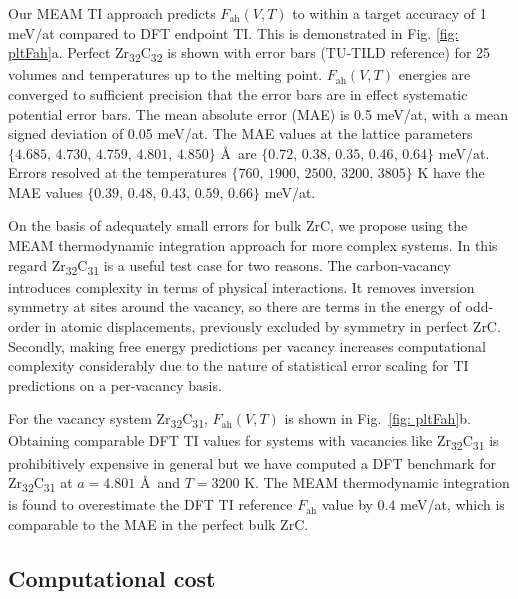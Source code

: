 \documentclass[twocolumn,american,aps,prb,showpacs,showkeys,amsmath,amssymb,superscriptaddress,a4]{revtex4-1}
\begin{document}
Our MEAM TI approach predicts $F_{\text{ah}}(V,T)$ to within
a target accuracy of 1 meV/at compared to DFT endpoint TI. This is
demonstrated in Fig. \ref{fig: pltFah}a. Perfect Zr\textsubscript{32}C\textsubscript{32}
is shown with error bars (TU-TILD reference) for 25 volumes and temperatures
up to the melting point. $F_{\text{ah}}(V,T)$ energies
are converged to sufficient precision that the error bars are in effect
systematic potential error bars. The mean absolute error (MAE) is
0.5 meV/at, with a mean signed deviation of 0.05 meV/at. The MAE values
at the lattice parameters $\{4.685,\,4.730,\,4.759,\,4.801,\,4.850\}$
\AA \ are $\{0.72,\,0.38,\,0.35,\,0.46,\,0.64\}$ meV/at. 
Errors resolved
at the temperatures $\{760,\,1900,\,2500,\,3200,\,3805\}$ K have
the MAE values $\{0.39,\,0.48,\,0.43,\,0.59,\,0.66\}$ meV/at. 

On the basis of adequately small errors for bulk ZrC, we propose using
the MEAM thermodynamic integration approach for more complex systems.
In this regard Zr\textsubscript{32}C\textsubscript{31} is a useful
test case for two reasons. The carbon-vacancy introduces complexity
in terms of physical interactions. It removes inversion symmetry at
 sites around the vacancy, so there are terms in the energy of odd-order in atomic displacements, previously
excluded by symmetry in perfect ZrC. Secondly, making free energy
predictions per vacancy increases computational complexity considerably due to the nature of statistical
error scaling for TI predictions on a per-vacancy basis. 

For the vacancy system Zr\textsubscript{32}C\textsubscript{31},
$F_{\text{ah}}(V,T)$ is shown in Fig.~\ref{fig: pltFah}b.
Obtaining comparable DFT TI values for systems with vacancies
like Zr\textsubscript{32}C\textsubscript{31} is prohibitively expensive
in general but we have computed a  DFT benchmark for Zr\textsubscript{32}C\textsubscript{31}
at $a=4.801$ \AA \ and $T=3200$ K. The MEAM thermodynamic integration
is found to overestimate the DFT TI reference $F_{\text{ah}}$ value
by $0.4$ meV/at, which is comparable to the MAE in the perfect bulk
ZrC.

\subsection{Computational cost\label{subsec: speedUp}}
\end{document}
